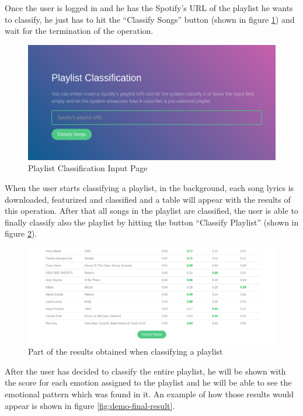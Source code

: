 Once the user is logged in and he has the Spotify's URL of the playlist he wants to classify, he just has to hit the ``Classify Songs'' button (shown in figure \ref{fig:demo-form}) and wait for the termination of the operation. 

\begin{figure}[H]
  \centering
  \includegraphics[width=1.0\textwidth]{./chapters/appendix1/images/demo-input}
  \caption{Playlist Classification Input Page}
  \label{fig:demo-form}
\end{figure}

When the user starts classifying a playlist, in the background, each song lyrics is downloaded, featurized and classified and a table will appear with the results of this operation. After that all songs in the playlist are classified, the user is able to finally classify also the playlist by hitting the button ``Classify Playlist'' (shown in figure \ref{fig:demo-playlist-classify}).

\begin{figure}[H]
  \centering
  \includegraphics[width=1.1\textwidth]{./chapters/appendix1/images/demo-playlist-classify}
  \caption{Part of the results obtained when classifying a playlist}
  \label{fig:demo-playlist-classify}
\end{figure}

After the user has decided to classify the entire playlist, he will be shown with the score for each emotion assigned to the playlist and he will be able to see the emotional pattern which was found in it. An example of how those results would appear is shown in figure \ref{fig:demo-final-result}.

